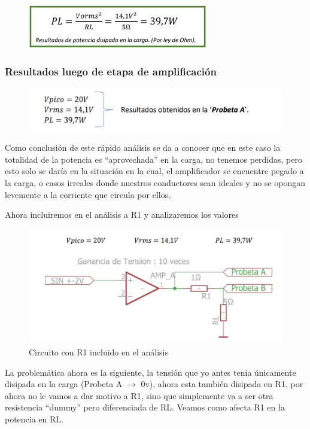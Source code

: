 \documentclass[../main.tex]{subfiles}
\begin{document}
	\begin{figure}[H]
		\includegraphics[width=0.7\textwidth]{imagen4.png}
		\centering
	\end{figure}

	\subsubsection*{Resultados luego de etapa de amplificación}

		\begin{figure}[H]
			\includegraphics[width=\textwidth]{imagen5.png}
			\centering
		\end{figure}

	Como conclusión de este rápido análisis se da a conocer que en este caso la 
	totalidad de la potencia es ``aprovechada'' en la carga, no tenemos perdidas, pero 
	esto solo se daría en la situación en la cual, el amplificador se encuentre pegado 
	a la carga, o casos irreales donde nuestros conductores sean ideales y no se 
	opongan levemente a la corriente que circula por ellos.

	Ahora incluiremos en el análisis a R1 y analizaremos los valores
	\begin{figure}[H]
		\includegraphics[width=\textwidth]{imagen6.png}
		\centering
		\caption{Circuito con R1 incluido en el análisis}
	\end{figure}
	La problemática ahora es la siguiente, la tensión que yo antes tenia 
	únicamente disipada en la carga (Probeta A $\rightarrow$ 0v), ahora esta 
	también disipada en R1, por ahora no le vamos a dar motivo a R1, sino que 
	simplemente va a ser otra resistencia ``dummy'' pero diferenciada de RL.
	Veamos como afecta R1 en la potencia en RL.
\end{document}
